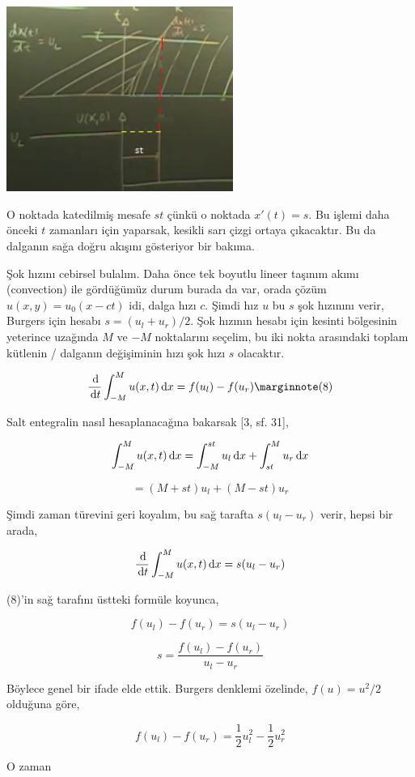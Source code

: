 \documentclass[12pt,fleqn]{article}\usepackage{../../common}
\begin{document}
\includegraphics[width=20em]{compscieng_bpp50fv1_05.png}

O noktada katedilmiş mesafe $st$ çünkü o noktada $x'(t) = s$. Bu işlemi daha
önceki $t$ zamanları için yaparsak, kesikli sarı çizgi ortaya çıkacaktır. Bu da
dalganın sağa doğru akışını gösteriyor bir bakıma.

Şok hızını cebirsel bulalım. Daha önce tek boyutlu lineer taşınım akımı
(convection) ile gördüğümüz durum burada da var, orada çözüm $u(x,y) =
u_0(x-ct)$ idi, dalga hızı $c$. Şimdi hız $u$ bu $s$ şok hızınını verir, Burgers
için hesabı $s = (u_l + u_r) / 2$.  Şok hızının hesabı için kesinti bölgesinin
yeterince uzağında $M$ ve $-M$ noktalarını seçelim, bu iki nokta arasındaki
toplam kütlenin / dalganın değişiminin hızı şok hızı $s$ olacaktır.

$$
\frac{\ud}{\ud t} \int_{-M}^{M} u(x,t) \ud x = f(u_l) - f(u_r)
\mlabel{8}
$$

Salt entegralin nasıl hesaplanacağına bakarsak [3, sf. 31],

$$
\int_{-M}^{M} u(x,t) \,\mathrm{d} x =
\int_{-M}^{st} u_l \,\mathrm{d} x + 
\int_{st}^{M} u_r \,\mathrm{d} x
$$

$$
= (M+st)u_l + (M-st)u_r
$$

Şimdi zaman türevini geri koyalım, bu sağ tarafta $s(u_l-u_r)$ verir, hepsi
bir arada,

$$
\frac{\,\mathrm{d}}{\,\mathrm{d} t} \int_{-M}^{M} u(x,t) \,\mathrm{d} x = s(u_l-u_r)
$$

(8)'in sağ tarafını üstteki formüle koyunca,

$$
f(u_l) - f(u_r) = s(u_l-u_r)
$$

$$
s = \frac{f(u_l) - f(u_r)}{u_l-u_r}
$$

Böylece genel bir ifade elde ettik. Burgers denklemi özelinde,
$f(u) = u^2 / 2$ olduğuna göre,

$$
f(u_l) - f(u_r) = \frac{1}{2} u_l^2 -  \frac{1}{2} u_r^2
$$

O zaman
\end{document}
